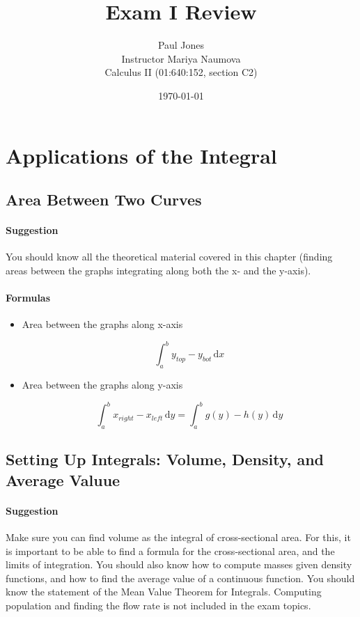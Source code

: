 \documentclass[11pt]{article}
\title{Exam I Review}
\author{Paul Jones \\
		Instructor Mariya Naumova\\
		Calculus II (01:640:152, section C2)}
\date{\today}
\begin{document}
\maketitle

\pagebreak

\setcounter{section}{5}

\section{Applications of the Integral}


	\subsection{Area Between Two Curves} 
		\paragraph{Suggestion} You should know all the theoretical material covered in this chapter 
		(finding areas between the graphs integrating along both the x- and the y-axis).
		
		\paragraph{Formulas} 
			\begin{itemize}
				\item Area between the graphs along x-axis
					
					\begin{equation*}
					\int_a^b \! y_{top} - y_{bot} \, \mathrm{d}x
					\end{equation*}
						
				\item Area between the graphs along y-axis
				
					\begin{equation*}
					\int_a^b \! x_{right} - x_{left} \, \mathrm{d}y = \int_a^b \! g(y) - h(y) \, \mathrm{d}y
					\end{equation*}
					
				\end{itemize}
		
		\pagebreak
		
	\subsection{Setting Up Integrals: Volume, Density, and Average Valuue}
		
		\paragraph{Suggestion} Make sure you can find volume as the integral of cross-sectional area. 
		For this, it is important to be able to find a formula for the cross-sectional area, and the limits of integration. 
		You should also know how to compute masses given density functions, and how to find the average value of a continuous function. 
		You should know the statement of the Mean Value Theorem for Integrals.
		Computing population and finding the flow rate is not included in the exam topics.
		
\end{document}
